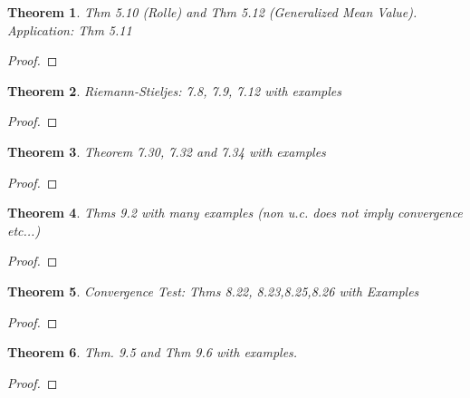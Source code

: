 \documentclass[aps,pra,notitlepage,amsmath,amssymb,letterpaper,12pt]{revtex4-1}
\newtheorem{theorem}{Theorem}
\begin{document}
\begin{theorem}
Thm 5.10 (Rolle) and Thm 5.12 (Generalized Mean Value). Application: Thm 5.11
\end{theorem}

\begin{proof}
\end{proof}

\begin{theorem}
Riemann-Stieljes: 7.8, 7.9, 7.12 with examples
\end{theorem}

\begin{proof}
\end{proof}

\begin{theorem}
 Theorem 7.30, 7.32 and 7.34 with examples
\end{theorem}

\begin{proof}
\end{proof}

\begin{theorem}
Thms 9.2 with many examples (non u.c. does not imply convergence etc...)
\end{theorem}

\begin{proof}
\end{proof}

\begin{theorem}
Convergence Test: Thms 8.22, 8.23,8.25,8.26 with Examples
\end{theorem}

\begin{proof}
\end{proof}

\begin{theorem}
Thm. 9.5 and Thm 9.6 with examples.
\end{theorem}

\begin{proof}
\end{proof}
\end{document}
